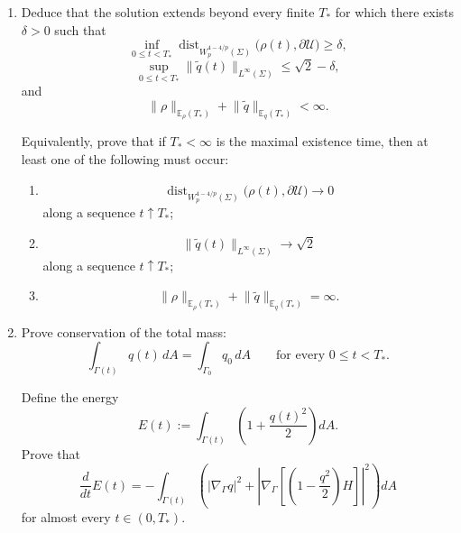 \documentclass[10pt,a4paper]{article}
\theoremstyle{definition}
\newcommand{\Erho}{\mathbb E_{\rho}}
\newcommand{\Eq}{\mathbb E_{q}}
\begin{document}
\begin{enumerate}
  \item Deduce that the solution extends beyond every finite $T_*$ for which
  there exists $\delta>0$ such that
  \begin{equation}
    \inf_{0\leq t<T_*}
    \operatorname{dist}_{W_p^{4-4/p}(\Sigma)}
    \bigl(\rho(t),\partial\mathcal U\bigr)
    \geq\delta,
  \end{equation}
  \begin{equation}
    \sup_{0\leq t<T_*}
    \lVert\widetilde q(t)\rVert_{L^\infty(\Sigma)}
    \leq\sqrt2-\delta,
  \end{equation}
  and
  \begin{equation}
    \lVert\rho\rVert_{\Erho(T_*)}
    +
    \lVert\widetilde q\rVert_{\Eq(T_*)}
    <\infty.
  \end{equation}

  Equivalently, prove that if $T_*<\infty$ is the maximal existence time,
  then at least one of the following must occur:
  \begin{enumerate}
    \item
    \begin{equation}
      \operatorname{dist}_{W_p^{4-4/p}(\Sigma)}
      \bigl(\rho(t),\partial\mathcal U\bigr)
      \longrightarrow0
    \end{equation}
    along a sequence $t\uparrow T_*$;

    \item
    \begin{equation}
      \lVert\widetilde q(t)\rVert_{L^\infty(\Sigma)}
      \longrightarrow\sqrt2
    \end{equation}
    along a sequence $t\uparrow T_*$;

    \item
    \begin{equation}
      \lVert\rho\rVert_{\Erho(T_*)}
      +
      \lVert\widetilde q\rVert_{\Eq(T_*)}
      =\infty.
    \end{equation}
  \end{enumerate}

  \item Prove conservation of the total mass:
  \begin{equation}
    \int_{\Gamma(t)}q(t)\,dA
    =
    \int_{\Gamma_0}q_0\,dA
    \qquad\text{for every }0\leq t<T_*.
  \end{equation}

  Define the energy
  \begin{equation}
    E(t)
    :=
    \int_{\Gamma(t)}
    \left(1+\frac{q(t)^2}{2}\right)dA.
  \end{equation}
  Prove that
  \begin{equation}
    \frac{d}{dt}E(t)
    =
    -\int_{\Gamma(t)}
    \left(
      |\nabla_\Gamma q|^2
      +
      \left|
        \nabla_\Gamma
        \left[\left(1-\frac{q^2}{2}\right)H\right]
      \right|^2
    \right)dA
  \end{equation}
  for almost every $t\in(0,T_*)$.


\end{enumerate}
\end{document}
